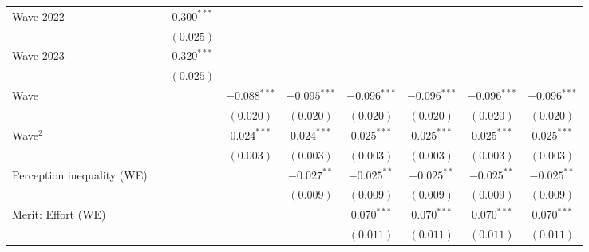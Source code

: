 \documentclass[
  12pt,
]{article}
\begin{document}
\begin{table}
\begin{center}
{\begin{tabular}{l c c c c c c c c}
\quad Wave 2022                                       &               & $0.300^{***}$  &                &                &                &                &                &                \\
                                                      &               & $(0.025)$      &                &                &                &                &                &                \\
\quad Wave 2023                                       &               & $0.320^{***}$  &                &                &                &                &                &                \\
                                                      &               & $(0.025)$      &                &                &                &                &                &                \\
Wave                                                  &               &                & $-0.088^{***}$ & $-0.095^{***}$ & $-0.096^{***}$ & $-0.096^{***}$ & $-0.096^{***}$ & $-0.096^{***}$ \\
                                                      &               &                & $(0.020)$      & $(0.020)$      & $(0.020)$      & $(0.020)$      & $(0.020)$      & $(0.020)$      \\
Wave$^2$                                              &               &                & $0.024^{***}$  & $0.024^{***}$  & $0.025^{***}$  & $0.025^{***}$  & $0.025^{***}$  & $0.025^{***}$  \\
                                                      &               &                & $(0.003)$      & $(0.003)$      & $(0.003)$      & $(0.003)$      & $(0.003)$      & $(0.003)$      \\
Perception inequality (WE)                            &               &                &                & $-0.027^{**}$  & $-0.025^{**}$  & $-0.025^{**}$  & $-0.025^{**}$  & $-0.025^{**}$  \\
                                                      &               &                &                & $(0.009)$      & $(0.009)$      & $(0.009)$      & $(0.009)$      & $(0.009)$      \\
Merit: Effort (WE)                                    &               &                &                &                & $0.070^{***}$  & $0.070^{***}$  & $0.070^{***}$  & $0.070^{***}$  \\
                                                      &               &                &                &                & $(0.011)$      & $(0.011)$      & $(0.011)$      & $(0.011)$      \\

\end{tabular}}
\end{center}
\end{table}
\end{document}
